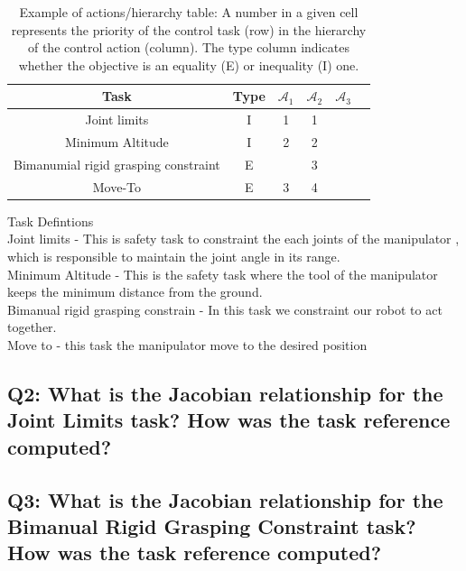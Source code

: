 \documentclass{article}
\begin{document}
\begin{table}[htb]
	\label{tbl:actions_tables}
	\begin{center}
		\footnotesize
		\begin{tabular}{cccccc}
			\toprule		
			Task & Type & $\mathcal{A}_{1}$ & $\mathcal{A}_{2}$  & $\mathcal{A}_{3}$  \\
			\midrule
			Joint limits                      & I & 1 & 1 &  \\
			\hdashline
			Minimum Altitude						& I & 2& 2 & \\
			\hdashline 
			Bimanumial rigid grasping constraint					& E & & 3 & \\
			\hdashline
			Move-To						& E & 3 & 4& \\ 
			
			\bottomrule
		\end{tabular}
	\end{center}
\caption{Example of actions/hierarchy table: A number in a given cell represents the priority of the control task (row) in the hierarchy of the control action (column). The type column indicates whether the objective is an equality (E) or inequality (I) one.}
\end{table}
\noindent
Task Defintions\\
Joint limits - This is safety task to constraint the each joints of the manipulator , which is responsible to maintain the joint angle in its range.\\
Minimum Altitude -  
This is the safety task where the tool of the manipulator keeps the minimum distance from the ground. \\
Bimanual rigid grasping constrain - In this task we constraint our robot to act together. \\
Move to - this task the manipulator move to the desired position 


\subsection{Q2: What is the Jacobian relationship for the Joint Limits task? How was the task reference computed?}


\subsection{Q3: What is the Jacobian relationship for the Bimanual Rigid Grasping Constraint task? How was the task reference computed?}
\end{document}
